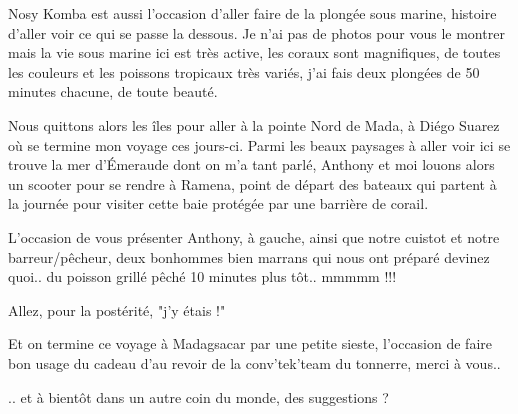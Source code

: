 \begin{multicols}{2}
Nosy Komba est aussi l'occasion d'aller faire de la plongée sous marine, histoire d'aller voir ce qui se passe la dessous. Je n'ai pas de photos pour vous le montrer mais la vie sous marine ici est très active, les coraux sont magnifiques, de toutes les couleurs et les poissons tropicaux très variés, j'ai fais deux plongées de 50 minutes chacune, de toute beauté.

Nous quittons alors les îles pour aller à la pointe Nord de Mada, à Diégo Suarez où se termine mon voyage ces jours-ci. Parmi les beaux paysages à aller voir ici se trouve la mer d'Émeraude dont on m'a tant parlé, Anthony et moi louons alors un scooter pour se rendre à Ramena, point de départ des bateaux qui partent à la journée pour visiter cette baie protégée par une barrière de corail.

L'occasion de vous présenter Anthony, à gauche, ainsi que notre cuistot et notre barreur/pêcheur, deux bonhommes bien marrans qui nous ont préparé devinez quoi.. du poisson grillé pêché 10 minutes plus tôt.. mmmmm !!!


Allez, pour la postérité, "j'y étais !"


Et on termine ce voyage à Madagsacar par une petite sieste, l'occasion de faire bon usage du cadeau d'au revoir de la conv'tek'team du tonnerre, merci à vous..


.. et à bientôt dans un autre coin du monde, des suggestions ?

\end{multicols}


